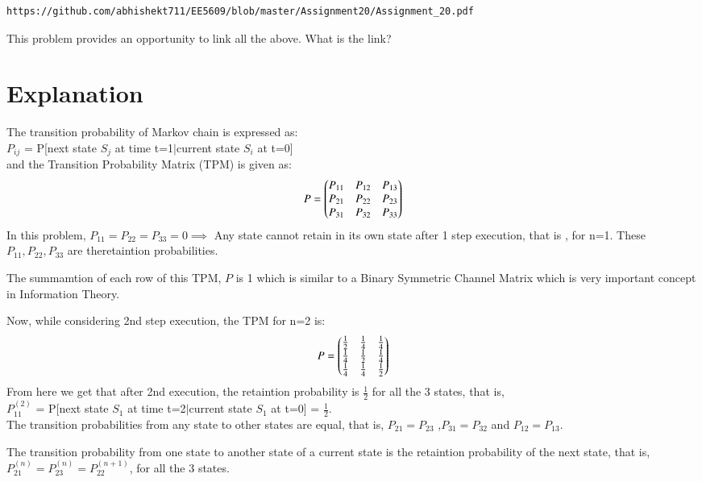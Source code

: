 \documentclass[journal,12pt,twocolumn]{IEEEtran}
\begin{document}
\begin{lstlisting}
https://github.com/abhishekt711/EE5609/blob/master/Assignment20/Assignment_20.pdf
\end{lstlisting}

This problem provides an opportunity to link all the above. What is the link?

\section{Explanation}

The transition probability of Markov chain is expressed as:\\
$P_{ij}$ = P[next state $S_j$ at time t=1$|$current state $S_i$ at t=0]\\
and the Transition Probability Matrix (TPM) is given as:
\begin{align}
P = \begin{pmatrix}P_{11} & P_{12} & P_{13}\\P_{21} & P_{22} & P_{23}\\P_{31} & P_{32} & P_{33}\end{pmatrix}
\end{align}
In this problem, $P_{11}=P_{22}=P_{33}=0 \implies$ Any state cannot retain in its own state after 1 step execution, that is , for n=1. These $P_{11},P_{22},P_{33}$ are theretaintion probabilities.


The summamtion of each row of this TPM, $P$ is 1 which is similar to a Binary Symmetric Channel Matrix which is very important concept in Information Theory.

Now, while considering 2nd step execution, the TPM for n=2 is:
\begin{align}
P = \begin{pmatrix}\frac{1}{2} & \frac{1}{4} & \frac{1}{4}\\\frac{1}{4} & \frac{1}{2} & \frac{1}{4}\\\frac{1}{4} & \frac{1}{4} & \frac{1}{2}\end{pmatrix}
\end{align}
From here we get that after 2nd execution, the retaintion probability is $\frac{1}{2}$ for all the 3 states, that is,\\
$P_{11}^{(2)}$ = P[next state $S_1$ at time t=2$|$current state $S_1$ at t=0] = $\frac{1}{2}$.\\

The transition probabilities from any state to other states are equal, that is, $P_{21}=P_{23}$ ,$P_{31}=P_{32}$ and $P_{12}=P_{13}$.

The transition probability from one state to another state of a current state is the retaintion probability of the next state, that is, $P_{21}^{(n)}=P_{23}^{(n)}=P_{22}^{(n+1)}$, for all the 3 states.
\end{document}
